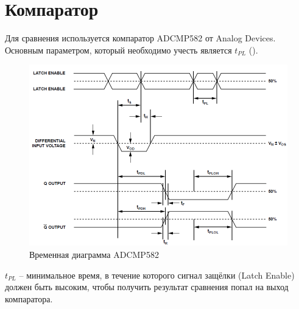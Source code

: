 \section{Компаратор}

Для сравнения используется компаратор ADCMP582 от Analog Devices. Основным параметром, который необходимо учесть является $ t_{PL} $ ().

\begin{figure}[ht!] 
	\center
	\includegraphics [scale=0.7] {my_folder/images//cmp_wave}
	\caption{Временная диаграмма ADCMP582} 
	\label{fig:cmp-wave}  
\end{figure}
\FloatBarrier

$ t_{PL} $ -- минимальное время, в течение которого сигнал защёлки (Latch Enable) должен быть высоким, чтобы получить результат сравнения попал на выход компаратора.

\newpage